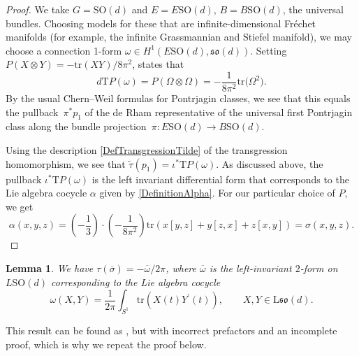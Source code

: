 \documentclass[11pt]{article}
\numberwithin{equation}{section}
\numberwithin{equation}{section}
\newtheorem{Lemma}[Theorem]{Lemma}
\newcommand{\tr}{\mathrm{tr}}
\newcommand{\SO}{\mathrm{SO}}
\renewcommand{\L}{\mathrm{L}}
\begin{document}
\begin{proof}
We take $G = \SO(d)$ and $E = E\SO(d)$, $B = B\SO(d)$, the universal bundles.
Choosing models for these that are infinite-dimensional Fr\'echet manifolds (for example, the infinite Grassmannian and Stiefel manifold), we may choose a connection 1-form $\omega \in H^1(E\SO(d), \mathfrak{so}(d))$.
Setting $P(X \otimes Y) = -\tr(XY)/8\pi^2$, \cite[Proposition~3.2]{ChernSimons} states that
\begin{equation*}
 d \mathrm{T}P(\omega) = P(\Omega \otimes \Omega) = -\frac{1}{8\pi^2}\tr\big(\Omega^2\big).
\end{equation*}
By the usual Chern--Weil formulas for Pontrjagin classes, we see that this equals the pullback~$\pi^*p_1$ of the de Rham representative of the universal first Pontrjagin class along the bundle projection~$\pi\colon E\SO(d) \to B\SO(d)$.

Using the description \eqref{DefTransgressionTilde} of the transgression homomorphism, we see that $\tilde{\tau}(p_1) = \iota^*\mathrm{T}P(\omega)$.
As discussed above, the pullback $\iota^*\mathrm{T}P(\omega)$ is the left invariant differential form that corresponds to the Lie algebra cocycle $\alpha$ given by \eqref{DefinitionAlpha}.
For our particular choice of $P$, we get
\[
\alpha(x, y, z) = \left(-\frac{1}{3}\right) \cdot\left(-\frac{1}{8\pi^2}\right) \tr(x [y, z] + y [z, x] + z [x, y])
= \sigma(x, y, z).\tag*{\qed}
\]\renewcommand{\qed}{}
\end{proof}



\begin{Lemma}
\label{LemmaA3}
We have $\tau(\overline{\sigma}) = -\overline{\omega}/2 \pi$, where $\overline{\omega}$ is the left-invariant $2$-form on $L\SO(d)$ corresponding to the Lie algebra cocycle
\begin{equation*}
 \omega(X, Y) = \frac{1}{2\pi}\int_{S^1} \tr(X(t)Y^\prime(t)), \qquad X, Y \in \L\mathfrak{so}(d).	
\end{equation*}
\end{Lemma}

This result can be found as \cite[Proposition~4.4.4]{PressleySegal}, but with incorrect prefactors and an incomplete proof, which is why we repeat the proof below.
\end{document}
